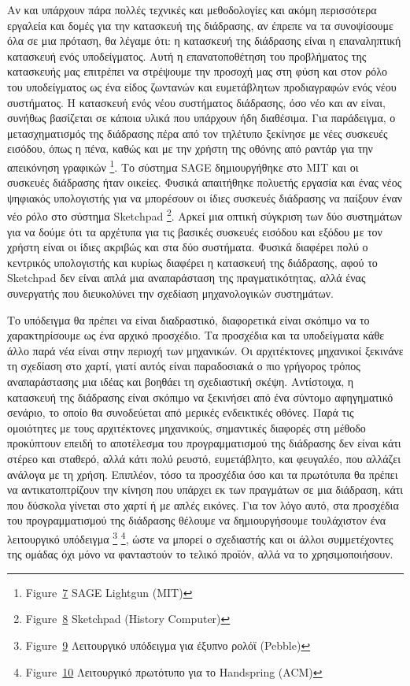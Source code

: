 \documentclass[
]{article}
\begin{document}
Αν και υπάρχουν πάρα πολλές τεχνικές και μεθοδολογίες και ακόμη
περισσότερα εργαλεία και δομές για την κατασκευή της διάδρασης, αν
έπρεπε να τα συνοψίσουμε όλα σε μια πρόταση, θα λέγαμε ότι: η κατασκευή
της διάδρασης είναι η επαναληπτική κατασκευή ενός υποδείγματος. Αυτή η
επανατοποθέτηση του προβλήματος της κατασκευής μας επιτρέπει να
στρέψουμε την προσοχή μας στη φύση και στον ρόλο του υποδείγματος ως ένα
είδος ζωντανών και ευμετάβλητων προδιαγραφών ενός νέου συστήματος. Η
κατασκευή ενός νέου συστήματος διάδρασης, όσο νέο και αν είναι, συνήθως
βασίζεται σε κάποια υλικά που υπάρχουν ήδη διαθέσιμα. Για παράδειγμα, ο
μετασχηματισμός της διάδρασης πέρα από τον τηλέτυπο ξεκίνησε με νέες
συσκευές εισόδου, όπως η πένα, καθώς και με την χρήστη της οθόνης από
ραντάρ για την απεικόνηση γραφικών \footnote{Figure~\protect\hyperlink{fig:sage-lightgun}{7}
  SAGE Lightgun (MIT)}. Το σύστημα SAGE δημιουργήθηκε στο MIT και οι
συσκευές διάδρασης ήταν οικείες. Φυσικά απαιτήθηκε πολυετής εργασία και
ένας νέος ψηφιακός υπολογιστής για να μπορέσουν οι ίδιες συσκευές
διάδρασης να παίξουν έναν νέο ρόλο στο σύστημα Sketchpad \footnote{Figure~\protect\hyperlink{fig:sketchpad-interaction}{8}
  Sketchpad (History Computer)}. Αρκεί μια οπτική σύγκριση των δύο
συστημάτων για να δούμε ότι τα αρχέτυπα για τις βασικές συσκευές εισόδου
και εξόδου με τον χρήστη είναι οι ίδιες ακριβώς και στα δύο συστήματα.
Φυσικά διαφέρει πολύ ο κεντρικός υπολογιστής και κυρίως διαφέρει η
κατασκευή της διάδρασης, αφού το Sketchpad δεν είναι απλά μια
αναπαράσταση της πραγματικότητας, αλλά ένας συνεργατής που διευκολύνει
την σχεδίαση μηχανολογικών συστημάτων.

Το υπόδειγμα θα πρέπει να είναι διαδραστικό, διαφορετικά είναι σκόπιμο
να το χαρακτηρίσουμε ως ένα αρχικό προσχέδιο. Τα προσχέδια και τα
υποδείγματα κάθε άλλο παρά νέα είναι στην περιοχή των μηχανικών. Οι
αρχιτέκτονες μηχανικοί ξεκινάνε τη σχεδίαση στο χαρτί, γιατί αυτός είναι
παραδοσιακά ο πιο γρήγορος τρόπος αναπαράστασης μια ιδέας και βοηθάει τη
σχεδιαστική σκέψη. Αντίστοιχα, η κατασκευή της διάδρασης είναι σκόπιμο
να ξεκινήσει από ένα σύντομο αφηγηματικό σενάριο, το οποίο θα
συνοδεύεται από μερικές ενδεικτικές οθόνες. Παρά τις ομοιότητες με τους
αρχιτέκτονες μηχανικούς, σημαντικές διαφορές στη μέθοδο προκύπτουν
επειδή το αποτέλεσμα του προγραμματισμού της διάδρασης δεν είναι κάτι
στέρεο και σταθερό, αλλά κάτι πολύ ρευστό, ευμετάβλητο, και φευγαλέο,
που αλλάζει ανάλογα με τη χρήση. Επιπλέον, τόσο τα προσχέδια όσο και τα
πρωτότυπα θα πρέπει να αντικατοπτρίζουν την κίνηση που υπάρχει εκ των
πραγμάτων σε μια διάδραση, κάτι που δύσκολα γίνεται στο χαρτί ή με απλές
εικόνες. Για τον λόγο αυτό, στα προσχέδια του προγραμματισμού της
διάδρασης θέλουμε να δημιουργήσουμε τουλάχιστον ένα λειτουργικό
υπόδειγμα \footnote{Figure~\protect\hyperlink{fig:pebble-hifi}{9}
  Λειτουργικό υπόδειγμα για έξυπνο ρολόϊ (Pebble)} \footnote{Figure~\protect\hyperlink{fig:handspring-buck}{10}
  Λειτουργικό πρωτότυπο για το Handspring (ACM)}, ώστε να μπορεί ο
σχεδιαστής και οι άλλοι συμμετέχοντες της ομάδας όχι μόνο να φανταστούν
το τελικό προϊόν, αλλά να το χρησιμοποιήσουν.
\end{document}

